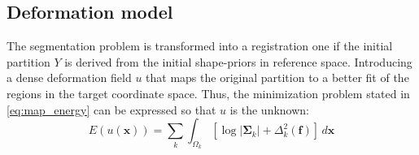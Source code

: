 \subsection{Deformation model}
\label{sec:deformation}
%
The segmentation problem is transformed into a registration one if the initial
partition $Y$ is derived from the initial shape-priors in reference space. 
Introducing a dense deformation field $u$ that maps the original partition to
a better fit of the regions in the target coordinate space. Thus, the minimization
problem stated in \autoref{eq:map_energy} can be expressed so that $u$ is the 
unknown:
\begin{equation}
E(u(\mathbf{x})) = \sum\limits_k \int_{\Omega_k} \left[ \log \left|\mathbf{\Sigma}_k\right| + \Delta^2_k (\mathbf{f}) \right] \,d\mathbf{x}
\label{eq:map_energy_deformation}
\end{equation}





